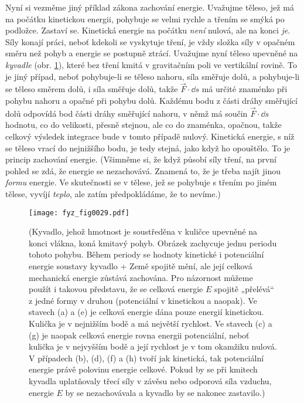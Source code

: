     Nyní si vezměme jiný příklad zákona zachování energie. Uvažujme těleso, jež má na počátku 
    kinetickou energii, pohybuje se velmi rychle a třením se smýká po podložce. Zastaví se. 
    Kinetická energie na počátku \emph{není} nulová, ale na konci \emph{je}. Síly konají práci, 
    neboť kdekoli se vyskytuje tření, je vždy složka síly v opačném směru než pohyb a energie se 
    postupně ztrácí. Uvažujme nyní těleso upevněné na \emph{kyvadle} (obr. \ref{fyz:fig0029}), které 
    bez tření kmitá v gravitačním poli ve vertikální rovině. To je jiný případ, neboť pohybuje-li 
    se těleso nahoru, síla směřuje dolů, a pohybuje-li se těleso směrem dolů, i síla směřuje dolů, 
    takže \(\vec{F}\cdot\dd{s}\) má určité znaménko při pohybu nahoru a opačné při pohybu dolů. 
    Každému bodu z části dráhy směřující dolů odpovídá bod části dráhy směřující nahoru, v němž má 
    součin \(\vec{F}\cdot\dd{s}\) hodnotu, co do velikosti, přesně stejnou, ale co do znaménka, 
    opačnou, takže celkový výsledek integrace bude v tomto případě nulový. Kinetická energie, s níž 
    se těleso vrací do nejnižšího bodu, je tedy stejná, jako když ho opouštělo. To je princip 
    zachování energie. (Všimněme si, že když působí síly tření, na první pohled se zdá, že energie 
    se nezachovává. Znamená to, že je třeba najít jinou \emph{formu} energie. Ve skutečnosti se v 
    tělese, jež se pohybuje s třením po jiném tělese, vyvíjí \emph{teplo}, ale zatím předpokládáme, 
    že to nevíme.)
    \begin{figure}[ht!]  %
      \centering
      \texttt{[image: fyz\_fig0029.pdf]}
      \caption{ (Kyvadlo, jehož hmotnost je soustředěna v kuličce upevněné na konci vlákna, koná 
                 kmitavý pohyb. Obrázek zachycuje jednu periodu tohoto pohybu. Během periody se 
                 hodnoty kinetické i potenciální energie soustavy kyvadlo + Země spojitě mění, ale 
                 její celková mechanická energie zůstává zachována. Pro názornost můžeme použít i 
                 takovou představu, že se celková energie \(E\) spojitě „přelévá“ z jedné formy v 
                 druhou (potenciální v kinetickou a naopak). Ve stavech (a) a (e) je celková  
                 energie dána pouze energií kinetickou. Kulička je v nejnižším bodě a má největší 
                 rychlost. Ve stavech (c) a (g) je naopak celková energie rovna energii 
                 potenciální, neboť kulička je v nejvyšším bodě a její rychlost je v tom okamžiku  
                 nulová. V případech (b), (d), (f) a (h) tvoří jak kinetická, tak potenciální    
                 energie právě polovinu energie celkové. Pokud by se při kmitech kyvadla 
                 uplatňovaly třecí síly v závěsu nebo odporová síla vzduchu, energie \(E\) by se 
                 nezachovávala a kyvadlo by se nakonec zastavilo.\cite[s.~177]{Halliday2001})}
      \label{fyz:fig0029}
    \end{figure}
    

